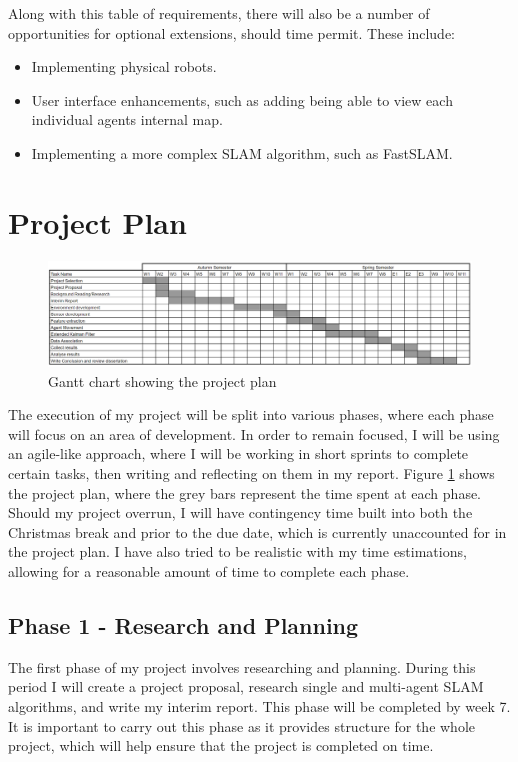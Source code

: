 \documentclass[12pt]{article}
\begin{document}
Along with this table of requirements, there will also be a number of opportunities for optional extensions, should time permit.
These include:
\begin{itemize}
    \item Implementing physical robots.
    \item User interface enhancements, such as adding being able to view each individual agents internal map.
    \item Implementing a more complex SLAM algorithm, such as FastSLAM.
\end{itemize}

\section{Project Plan}
\begin{figure}[H]
    \centering
    \includegraphics[width=0.8\linewidth]{gantt_chart.png}
    \caption{Gantt chart showing the project plan}
    \label{fig:gantt_chart}
\end{figure}
The execution of my project will be split into various phases, where each phase will focus on an area of development.
In order to remain focused, I will be using an agile-like approach, where I will be working in short sprints to complete
certain tasks, then writing and reflecting on them in my report. Figure \ref{fig:gantt_chart} shows the project plan,
where the grey bars represent the time spent at each phase. Should my project overrun, I will have contingency time
built into both the Christmas break and prior to the due date, which is currently unaccounted for in the project plan.
I have also tried to be realistic with my time estimations, allowing for a reasonable amount of time to complete each
phase.\\

\subsection{Phase 1 - Research and Planning}
The first phase of my project involves researching and planning. During this period I will create a project proposal,
research single and multi-agent SLAM algorithms, and write my interim report. This phase will be completed by week 7. It is
important to carry out this phase as it provides structure for the whole project, which will help ensure that the project is
completed on time.
\end{document}
